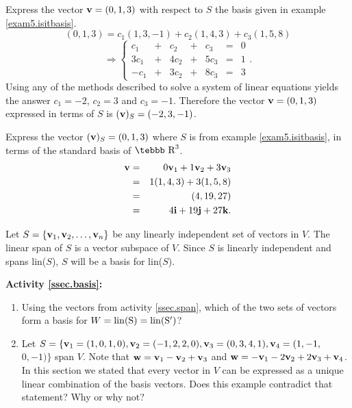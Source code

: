 \begin{example}
\label{exam5.wrtbasis} Express the vector ${\bf v}=(0,1,3)$ with
respect to $S$ the basis given in example \ref{exam5.isitbasis}.
$$ (0,1,3)=c_1(1,3,-1)+c_2(1,4,3)+c_3(1,5,8)$$
$$\Rightarrow \left
\{ \begin{array}{rrrrrrr}
                                c_1&+&c_2&+&c_3&=&0\\
                                3c_1&+&4c_2&+&5c_3&=&1\\
                                -c_1&+&3c_2&+&8c_3&=&3 \end{array} \right
                                . . $$
Using any of the methods described to solve a system of linear
equations yields the answer $c_1=-2$, $c_2=3$ and $c_3=-1$.
Therefore the vector ${\bf v}=(0,1,3)$ expressed in terms of $S$
is $({\bf v})_S=(-2,3,-1)$. \end{example}

\begin{example}
\label{exam5.wrtbasisR3} Express the vector $({\bf v})_S=(0,1,3)$
where $S$ is from example \ref{exam5.isitbasis}, in terms of the
standard basis of $\mbox{\tebbb R}^3$.
\begin{eqnarray*}
{\bf v}&=&0{\bf v}_1+1{\bf v}_2+3{\bf v}_3\\
&=&1(1,4,3)+3(1,5,8)\\ &=&(4,19,27) \\ &=& 4{\bf i}+19{\bf
j}+27{\bf k} .
\end{eqnarray*}
\end{example}

Let $S=\{{\bf v}_1,{\bf v}_2, \ldots, {\bf v}_n\}$ be any linearly
independent set of vectors in $V$.  The linear span of $S$ is a
vector subspace of $V$. Since $S$ is linearly independent and
spans lin($S$), $S$ will be a basis for lin($S$).

{\bf Activity \ref{ssec.basis}:}

\begin{enumerate}
\item Using the vectors from activity \ref{ssec.span}, which of
the two sets of vectors form a basis for
$W=\rm{lin}(S)=\rm{lin}(S')$?
\item Let $S=\{{\bf v}_1=(1,0,1,0), {\bf v}_2=(-1,2,2,0), {\bf v}_3=(0,3,4,1),
{\bf v}_4=(1,-1,$\\$0,-1) \}$ span $V$. Note that ${\bf w}={\bf
v}_1-{\bf v}_2+{\bf v}_3$ and ${\bf w}=-{\bf v}_1-2{\bf v}_2+2{\bf
v}_3+{\bf v}_4$. In this section we stated that every vector in
$V$ can be expressed as a unique linear combination of the basis
vectors. Does this example contradict that statement? Why or why
not?
\end{enumerate}

